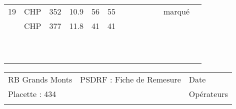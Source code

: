 \documentclass[a4paper, landscape]{article}\usepackage[]{graphicx}\usepackage[]{color}
\begin{document}
{\begin{tabular}{|p{1cm}|p{2cm}|p{1.6cm}|p{1.6cm}|p{1.6cm}|p{1.6cm}|p{1.5cm}|p{1.5cm}|p{1.5cm}|p{1.5cm}|p{1.5cm}|p{7.5cm}|p{5cm}|}
19 & CHP & 352 & 10.9 & 56 & 55 &  &  &  &  &  & marqué &  \\ 
   \rowcolor[gray]{0.95} \hline
20 & CHP & 377 & 11.8 & 41 & 41 &  &  &  &  &  &  &  \\ 
   \hline
 &  &  &  &  &  &  &  &  &  &  &  &  \\ 
   \rowcolor[gray]{0.95} \hline
 &  &  &  &  &  &  &  &  &  &  &  &  \\ 
   \hline
 &  &  &  &  &  &  &  &  &  &  &  &  \\ 
   \rowcolor[gray]{0.95} \hline
 &  &  &  &  &  &  &  &  &  &  &  &  \\ 
   \hline
 &  &  &  &  &  &  &  &  &  &  &  &  \\ 
   \rowcolor[gray]{0.95} \hline
 &  &  &  &  &  &  &  &  &  &  &  &  \\ 
   \hline
 &  &  &  &  &  &  &  &  &  &  &  &  \\ 
   \rowcolor[gray]{0.95} \hline
 &  &  &  &  &  &  &  &  &  &  &  &  \\ 
   \hline
 &  &  &  &  &  &  &  &  &  &  &  &  \\ 
   \rowcolor[gray]{0.95} \hline
 &  &  &  &  &  &  &  &  &  &  &  &  \\ 
   \hline
\end{tabular}
}

\begin{tabular}{p{10cm}p{10cm}p{8cm}}
  RB Grands Monts & PSDRF : Fiche de Remesure & Date \\ 
  Placette : 434 &  & Opérateurs \\ 
   &  &  \\ 
  \end{tabular}
\end{document}
